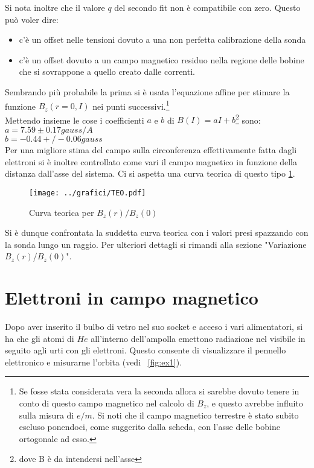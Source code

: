\documentclass[10pt,a4paper]{article}
\begin{document}
Si nota inoltre che il valore $q$ del secondo fit non è compatibile con zero. Questo può voler dire:\\
\begin{itemize}
\item c'è un offset nelle tensioni dovuto a una non perfetta calibrazione della sonda\\
\item c'è un offset dovuto a un campo magnetico residuo nella regione delle bobine che si sovrappone a quello creato dalle correnti.\\
\end{itemize}
Sembrando più probabile la prima si è usata l'equazione affine per stimare la funzione $B_z(r=0, I)$ nei punti successivi.\footnote{Se fosse stata considerata vera la seconda allora si sarebbe dovuto tenere in conto di questo campo magnetico nel calcolo di $B_z$, e questo avrebbe influito sulla misura di $e/m$. Si noti che il campo magnetico terrestre è stato subito escluso ponendoci, come suggerito dalla scheda, con l'asse delle bobine ortogonale ad esso.}\\
Mettendo insieme le cose i coefficienti $a$ e $b$ di $B(I)=aI+b$\footnote{dove B è da intendersi nell'asse} sono:\\
$a=7.59\pm0.17 gauss/A$\\
$b=-0.44+/-0.06 gauss$\\


Per una migliore stima del campo sulla circonferenza effettivamente fatta dagli elettroni si è inoltre controllato come vari il campo magnetico in funzione della distanza dall'asse del sistema. Ci si aspetta una curva teorica di questo tipo \ref{fig:TEO}.


\begin{figure}[H]
	\centering
	\texttt{[image: ../grafici/TEO.pdf]}
	\caption{Curva teorica per $B_z(r)/B_z(0)$}
	\label{fig:TEO}
\end{figure}


Si è dunque confrontata la suddetta curva teorica con i valori presi spazzando con la sonda lungo un raggio. Per ulteriori dettagli si rimandi alla sezione "Variazione $B_z(r)$/$B_z(0)$".



\section{Elettroni in campo magnetico}
Dopo aver inserito il bulbo di vetro nel suo socket e acceso i vari alimentatori, si ha che gli atomi di $He$ all'interno dell'ampolla emettono radiazione nel visibile in seguito agli urti con gli elettroni. Questo consente di visualizzare il pennello elettronico e misurarne l'orbita (vedi \figurename{~\ref{fig:ex1}}).
\end{document}
